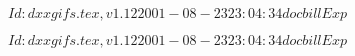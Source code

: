 \documentclass{article}
\begin{document}
$Id: dxxgifs.tex,v 1.12 2001-08-23 23:04:34 docbill Exp $


\pagebreak


$Id: dxxgifs.tex,v 1.12 2001-08-23 23:04:34 docbill Exp $


\pagebreak
\end{document}
